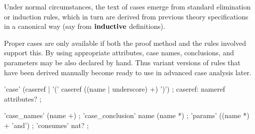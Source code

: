 Under normal circumstances, the text of cases emerge from standard elimination
or induction rules, which in turn are derived from previous theory
specifications in a canonical way (say from ${\mathord{\mathbf{inductive}}}$
definitions).

\medskip Proper cases are only available if both the proof method and the
rules involved support this.  By using appropriate attributes, case names,
conclusions, and parameters may be also declared by hand.  Thus variant
versions of rules that have been derived manually become ready to use in
advanced case analysis later.

\begin{rail}
  'case' (caseref | '(' caseref ((name | underscore) +) ')')
  ;
  caseref: nameref attributes?
  ;

  'case\_names' (name +)
  ;
  'case\_conclusion' name (name *)
  ;
  'params' ((name *) + 'and')
  ;
  'consumes' nat?
  ;
\end{rail}

